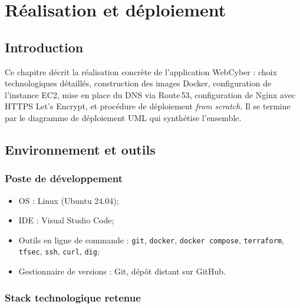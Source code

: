 \chapter{Réalisation et déploiement}

\section*{Introduction}

Ce chapitre décrit la réalisation concrète de l'application
WebCyber : choix technologiques détaillés, construction des images
Docker, configuration de l'instance EC2, mise en place du DNS via
Route\,53, configuration de Nginx avec HTTPS Let's Encrypt, et
procédure de déploiement \textit{from scratch}. Il se termine par le
diagramme de déploiement UML qui synthétise l'ensemble.

\section{Environnement et outils}

\subsection{Poste de développement}

\begin{itemize}
  \item OS : Linux (Ubuntu 24.04);
  \item IDE : Visual Studio Code;
  \item Outils en ligne de commande : \texttt{git}, \texttt{docker},
        \texttt{docker compose}, \texttt{terraform}, \texttt{tfsec},
        \texttt{ssh}, \texttt{curl}, \texttt{dig};
  \item Gestionnaire de versions : Git, dépôt distant sur GitHub.
\end{itemize}

\subsection{Stack technologique retenue}

